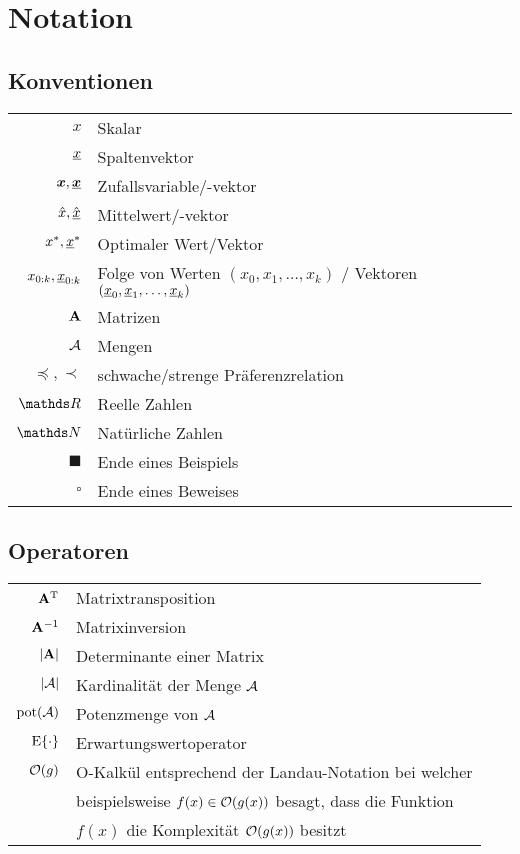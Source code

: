 \chapter*{Notation}

\section*{Konventionen}
%
\begin{tabular}{rl}
$x$ & Skalar
\\
${\underline{x}}$ & Spaltenvektor
\\
${\boldsymbol{x}}, {\boldsymbol{\underline{x}}}$ & Zufallsvariable/-vektor
\\
$\hat x, \hat{{\underline{x}}}$ & Mittelwert/-vektor
\\
$x^*, {\underline{x}}^*$ & Optimaler Wert/Vektor
\\
$x_{0:k}, {\underline{x}}_{0:k}$ & Folge von Werten $(x_0, x_1, \ldots, x_k)$ / Vektoren $({\underline{x}}_0, {\underline{x}}_1, \ldots, {\underline{x}}_k)$
\\
${{\mathbf{A}}}$ & Matrizen
\\
$\mathcal A$ & Mengen
\\
$\preceq, \prec$ & schwache/strenge Präferenzrelation
\\
$\NewR$ & Reelle Zahlen
\\
$\NewN$ & Natürliche Zahlen
\\
$\blacksquare$ & Ende eines Beispiels
\\
$\square$	& Ende eines Beweises
\end{tabular}

\section*{Operatoren}
%
\begin{tabular}{rl}
${{\mathbf{A}}}^\mathrm{T}$ & Matrixtransposition
\\
${{\mathbf{A}}}^{-1}$ & Matrixinversion
\\
$|{{\mathbf{A}}}|$ & Determinante einer Matrix
\\
$|\mathcal A|$ & Kardinalität der Menge $\mathcal A$
\\
$\operatorname{pot}(\mathcal A)$ & Potenzmenge von $\mathcal A$
\\
$\operatorname{E}\{\cdot\}$ & Erwartungswertoperator
\\
$\mathcal O(g)$ & O-Kalkül entsprechend der Landau-Notation bei welcher \\&beispielsweise $f(x) \in \mathcal O(g(x))$ besagt, dass die Funktion \\&$f(x)$ die Komplexität $\mathcal O(g(x))$ besitzt
\end{tabular}

